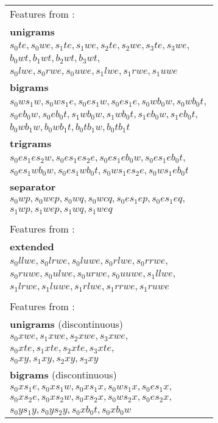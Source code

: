 \documentclass[11pt]{article}
\begin{document}
\begin{figure}
\begin{tabular}{>{\small}l}
{\footnotesize Features from \cite{zhang2009transition}:} \\
\textbf{unigrams} \\
$s_0te, s_0we, s_1te, s_1we, s_2te, s_2we, s_3te, s_3we,$ \\
$b_0wt, b_1wt, b_2wt, b_3wt,$ \\
$s_0lwe, s_0rwe, s_0uwe, s_1lwe, s_1rwe, s_1uwe$ \\
\textbf{bigrams} \\
$s_0ws_1w, s_0ws_1e, s_0es_1w, s_0es_1e, s_0wb_0w, s_0wb_0t,$ \\
$s_0eb_0w, s_0eb_0t, s_1wb_0w, s_1wb_0t, s_1eb_0w, s_1eb_0t,$ \\
$b_0wb_1w, b_0wb_1t, b_0tb_1w, b_0tb_1t$ \\
\textbf{trigrams} \\
$s_0es_1es_2w, s_0es_1es_2e, s_0es_1eb_0w, s_0es_1eb_0t,$ \\
$s_0es_1wb_0w, s_0es_1wb_0t, s_0ws_1es_2e, s_0ws_1eb_0t$ \\
\textbf{separator} \\
$s_0wp, s_0wep, s_0wq, s_0wcq, s_0es_1ep, s_0es_1eq,$ \\
$s_1wp, s_1wep, s_1wq, s_1weq$ \\
\\
{\footnotesize Features from \cite{zhu2013fast}:} \\
\textbf{extended} \\
$s_0llwe, s_0lrwe, s_0luwe, s_0rlwe, s_0rrwe,$ \\
$s_0ruwe, s_0ulwe, s_0urwe, s_0uuwe, s_1llwe,$ \\
$s_1lrwe, s_1luwe, s_1rlwe, s_1rrwe, s_1ruwe$ \\
\\
{\footnotesize Features from \cite{maier2015discontinuous}:} \\
\textbf{unigrams} (discontinuous) \\
$s_0xwe, s_1xwe, s_2xwe, s_3xwe,$ \\
$s_0xte, s_1xte, s_2xte, s_3xte,$ \\
$s_0xy, s_1xy, s_2xy, s_3xy$ \\
\textbf{bigrams} (discontinuous) \\
$s_0xs_1e, s_0xs_1w, s_0xs_1x, s_0ws_1x, s_0es_1x,$ \\
$s_0xs_2e, s_0xs_2w, s_0xs_2x, s_0ws_2x, s_0es_2x,$ \\
$s_0ys_1y, s_0ys_2y, s_0xb_0t, s_0xb_0w$ \\

\end{tabular}
\end{figure}
\end{document}
